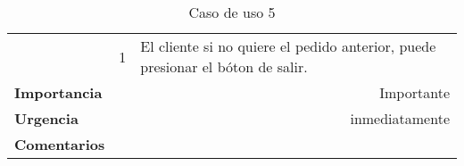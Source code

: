 \documentclass[conference]{IEEEtran}
\begin{document}
\begin{table}[H]
\begin{adjustbox}{width=0.44\textwidth}
\begin{tabular}{|p{11.215em}|r|r|}
\cmidrule{2-3}    \multicolumn{1}{|c|}{} & \multicolumn{1}{c|}{\multirow{2}[2]{*}{1}} & \multicolumn{1}{l|}{\multirow{2}[2]{*}{El cliente si no quiere el pedido anterior, puede presionar el bóton de salir.}} \\
    \multicolumn{1}{|c|}{} &       &  \\
    \midrule
    \textbf{Importancia} & \multicolumn{2}{p{37.355em}|}{Importante} \\
    \midrule
    \textbf{Urgencia} & \multicolumn{2}{p{37.355em}|}{inmediatamente} \\
    \midrule
    \textbf{Comentarios} & \multicolumn{2}{r|}{} \\
    \bottomrule
    \end{tabular}%
    \end{adjustbox}
    \vspace{0.2cm}
    \caption{Caso de uso 5}
  \label{tab:addlabel}%
\end{table}%
\end{document}

